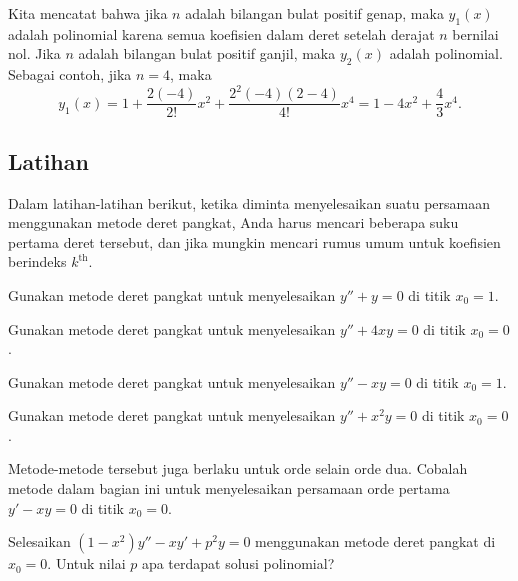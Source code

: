 \begin{example}
Kita mencatat bahwa jika $n$ adalah bilangan bulat positif genap, maka $y_1(x)$ adalah
polinomial karena semua koefisien dalam deret setelah
derajat $n$ bernilai nol. Jika $n$ adalah bilangan bulat positif ganjil, maka $y_2(x)$ adalah
polinomial. Sebagai contoh, jika $n=4$, maka
\begin{equation*}
y_1(x) = 1 + \frac{2(-4)}{2!} x^2 + \frac{2^2(-4)(2-4)}{4!} x^4
= 1 - 4x^2 + \frac{4}{3} x^4 .
\end{equation*}
\end{example}

\subsection{Latihan}

Dalam latihan-latihan berikut, ketika diminta menyelesaikan suatu persamaan menggunakan metode
deret pangkat, Anda harus mencari beberapa suku pertama deret tersebut,
dan jika mungkin mencari rumus umum untuk koefisien berindeks $k^{\text{th}}$.

\begin{exercise}
Gunakan metode deret pangkat untuk menyelesaikan $y''+y = 0$ di titik $x_0 = 1$.
\end{exercise}

\begin{exercise}
Gunakan metode deret pangkat untuk menyelesaikan $y''+4xy = 0$ di titik $x_0 = 0$.
\end{exercise}

\begin{exercise}
Gunakan metode deret pangkat untuk menyelesaikan $y''-xy = 0$ di titik $x_0 = 1$.
\end{exercise}

\begin{exercise}
Gunakan metode deret pangkat untuk menyelesaikan $y''+x^2y = 0$ di titik $x_0 = 0$.
\end{exercise}

\begin{exercise}
Metode-metode tersebut juga berlaku untuk orde selain orde dua. Cobalah metode
dalam bagian ini untuk menyelesaikan persamaan orde pertama $y'-xy = 0$ di
titik $x_0 = 0$.
\end{exercise}

\begin{exercise}
\leavevmode
\begin{tasks}
\task Selesaikan $(1-x^2)y''-xy' + p^2y = 0$ menggunakan metode deret pangkat di $x_0=0$.
\task Untuk nilai $p$ apa terdapat solusi polinomial?
\end{tasks}
\end{exercise}

